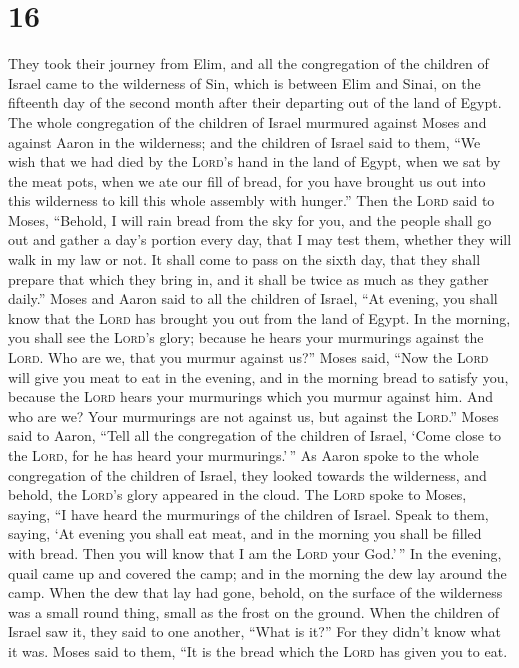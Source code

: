 \hypertarget{section-15}{%
\section{16}\label{section-15}}

 They took their journey from Elim, and all the
congregation of the children of Israel came to the wilderness of Sin,
which is between Elim and Sinai, on the fifteenth day of the second
month after their departing out of the land of Egypt.  The
whole congregation of the children of Israel murmured against Moses and
against Aaron in the wilderness;  and the children of
Israel said to them, ``We wish that we had died by the \textsc{Lord}'s
hand in the land of Egypt, when we sat by the meat pots, when we ate our
fill of bread, for you have brought us out into this wilderness to kill
this whole assembly with hunger.''  Then the \textsc{Lord}
said to Moses, ``Behold, I will rain bread from the sky for you, and the
people shall go out and gather a day's portion every day, that I may
test them, whether they will walk in my law or not.  It
shall come to pass on the sixth day, that they shall prepare that which
they bring in, and it shall be twice as much as they gather daily.''
 Moses and Aaron said to all the children of Israel, ``At
evening, you shall know that the \textsc{Lord} has brought you out from
the land of Egypt.  In the morning, you shall see the
\textsc{Lord}'s glory; because he hears your murmurings against the
\textsc{Lord}. Who are we, that you murmur against us?'' 
Moses said, ``Now the \textsc{Lord} will give you meat to eat in the
evening, and in the morning bread to satisfy you, because the
\textsc{Lord} hears your murmurings which you murmur against him. And
who are we? Your murmurings are not against us, but against the
\textsc{Lord}.''  Moses said to Aaron, ``Tell all the
congregation of the children of Israel, `Come close to the
\textsc{Lord}, for he has heard your murmurings.'\,''  As
Aaron spoke to the whole congregation of the children of Israel, they
looked towards the wilderness, and behold, the \textsc{Lord}'s glory
appeared in the cloud.  The \textsc{Lord} spoke to Moses,
saying,  ``I have heard the murmurings of the children of
Israel. Speak to them, saying, `At evening you shall eat meat, and in
the morning you shall be filled with bread. Then you will know that I am
the \textsc{Lord} your God.'\,''  In the evening, quail
came up and covered the camp; and in the morning the dew lay around the
camp.  When the dew that lay had gone, behold, on the
surface of the wilderness was a small round thing, small as the frost on
the ground.  When the children of Israel saw it, they
said to one another, ``What is it?'' For they didn't know what it was.
Moses said to them, ``It is the bread which the \textsc{Lord} has given
you to eat.

